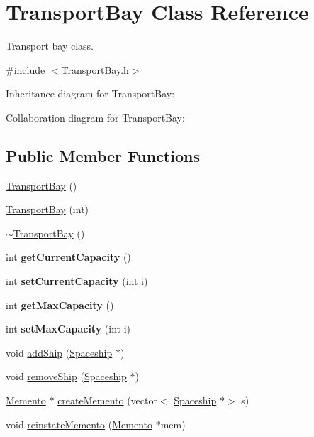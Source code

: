 \hypertarget{classTransportBay}{}\section{Transport\+Bay Class Reference}
\label{classTransportBay}


Transport bay class.  




{\ttfamily \#include $<$Transport\+Bay.\+h$>$}



Inheritance diagram for Transport\+Bay\+:


Collaboration diagram for Transport\+Bay\+:
\subsection*{Public Member Functions}
\begin{DoxyCompactItemize}
\item 
\hyperlink{classTransportBay_a878d1695b58a12ccd698a85f9e01ffb6}{Transport\+Bay} ()
\item 
\hyperlink{classTransportBay_a731f9665c1fb62d3c533f1323a8742de}{Transport\+Bay} (int)
\item 
\hyperlink{classTransportBay_a14dad2eb1e9cb83bb85de4574c2bcbb2}{$\sim$\+Transport\+Bay} ()
\item 
\mbox{\label{classTransportBay_a3e28498ac79aaf21921c1d03917ef390}} 
int {\bfseries get\+Current\+Capacity} ()
\item 
\mbox{\label{classTransportBay_adc883bc6b55736576e3a400ba8de4b8b}} 
int {\bfseries set\+Current\+Capacity} (int i)
\item 
\mbox{\label{classTransportBay_a4d19bec72afdf29f7bb693610e62759c}} 
int {\bfseries get\+Max\+Capacity} ()
\item 
\mbox{\label{classTransportBay_a504e2ae52391c29e633e79fc5a46de22}} 
int {\bfseries set\+Max\+Capacity} (int i)
\item 
void \hyperlink{classTransportBay_acd6b5b09e81bd28c6dcbe23d561fd99c}{add\+Ship} (\hyperlink{classSpaceship}{Spaceship} $\ast$)
\item 
void \hyperlink{classTransportBay_a053ab5bbf5b6cafe1f5b3782176bd214}{remove\+Ship} (\hyperlink{classSpaceship}{Spaceship} $\ast$)
\item 
\hyperlink{classMemento}{Memento} $\ast$ \hyperlink{classTransportBay_aff9390fd8b7434bfa03b408028caf920}{create\+Memento} (vector$<$ \hyperlink{classSpaceship}{Spaceship} $\ast$$>$ s)
\item 
void \hyperlink{classTransportBay_a501256401b6845a16ced9ea65c294f70}{reinstate\+Memento} (\hyperlink{classMemento}{Memento} $\ast$mem)
\end{DoxyCompactItemize}
